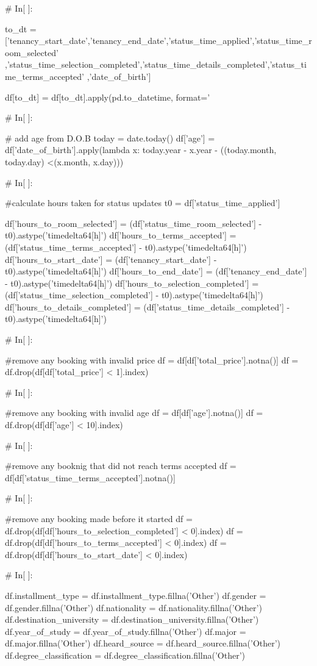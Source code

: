 \begin{python}
# In[ ]:


to_dt = ['tenancy_start_date','tenancy_end_date','status_time_applied','status_time_room_selected'
         ,'status_time_selection_completed','status_time_details_completed','status_time_terms_accepted'
         ,'date_of_birth']

df[to_dt] = df[to_dt].apply(pd.to_datetime, format='%


# In[ ]:


# add age from D.O.B 
today = date.today()
df['age'] = df['date_of_birth'].apply(lambda x: today.year - x.year - ((today.month, today.day) <(x.month, x.day)))


# In[ ]:


#calculate hours taken for status updates
t0 = df['status_time_applied']
    
df['hours_to_room_selected'] = (df['status_time_room_selected'] - t0).astype('timedelta64[h]')
df['hours_to_terms_accepted'] = (df['status_time_terms_accepted'] - t0).astype('timedelta64[h]')
df['hours_to_start_date'] = (df['tenancy_start_date'] - t0).astype('timedelta64[h]')
df['hours_to_end_date'] = (df['tenancy_end_date'] - t0).astype('timedelta64[h]')
df['hours_to_selection_completed'] = (df['status_time_selection_completed'] - t0).astype('timedelta64[h]')
df['hours_to_details_completed'] = (df['status_time_details_completed'] - t0).astype('timedelta64[h]')


# In[ ]:


#remove any booking with invalid price
df = df[df['total_price'].notna()]
df = df.drop(df[df['total_price'] < 1].index)


# In[ ]:


#remove any booking with invalid age
df = df[df['age'].notna()]
df = df.drop(df[df['age'] < 10].index)


# In[ ]:


#remove any booknig that did not reach terms accepted
df = df[df['status_time_terms_accepted'].notna()]


# In[ ]:


#remove any booking made before it started
df = df.drop(df[df['hours_to_selection_completed'] < 0].index)
df = df.drop(df[df['hours_to_terms_accepted'] < 0].index)
df = df.drop(df[df['hours_to_start_date'] < 0].index)


# In[ ]:


df.installment_type = df.installment_type.fillna('Other')
df.gender = df.gender.fillna('Other')
df.nationality = df.nationality.fillna('Other')
df.destination_university = df.destination_university.fillna('Other')
df.year_of_study = df.year_of_study.fillna('Other')
df.major = df.major.fillna('Other')
df.heard_source = df.heard_source.fillna('Other')
df.degree_classification = df.degree_classification.fillna('Other')



\end{python}
